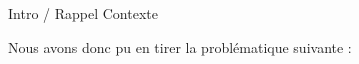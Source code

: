 \label{conclusion}

Intro / Rappel Contexte

Nous avons donc pu en tirer la problématique suivante :



